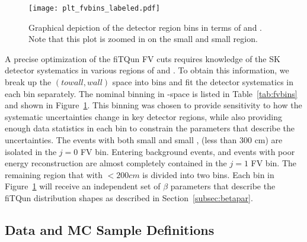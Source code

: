 {\begin{figure}
  \begin{center}
    \texttt{[image: plt\_fvbins\_labeled.pdf]}
  \end{center}
  \caption{Graphical depiction of the detector region bins in terms of \wall
  and \towall.  Note that this plot is zoomed in on the small \wall and small
  \towall region.}
  \label{fig:fvbindef}
\end{figure}

A precise optimization of the fiTQun FV cuts requires knowledge of the SK
detector systematics in various regions of \wall and \towall.  To obtain this
information, we break up the $(towall,wall)$ space into bins and fit the
detector systematics in each bin separately.  The nominal binning in
\wall-\towall space is listed in Table~\ref{tab:fvbins} and shown in
Figure~\ref{fig:fvbindef}.  This binning was chosen to provide sensitivity to
how the systematic uncertainties change in key detector regions, while also
providing enough data statistics in each bin to constrain the parameters that
describe the uncertainties.  The events with both small \wall and small
\towall, (less than 300 cm) are isolated in the $j = 0$ FV bin.  Entering
background events, and events with poor energy reconstruction are almost
completely contained in the $j = 1$ FV bin.  The remaining region that with
\wall $< 200cm$ is divided into two \towall bins.  Each bin in
Figure~\ref{fig:fvbindef} will receive an independent set of $\beta$ parameters
that describe the fiTQun distribution shapes as described in
Section~\ref{subsec:betapar}.




\subsection{Data and MC Sample Definitions}
\label{subsec:samples}

}
